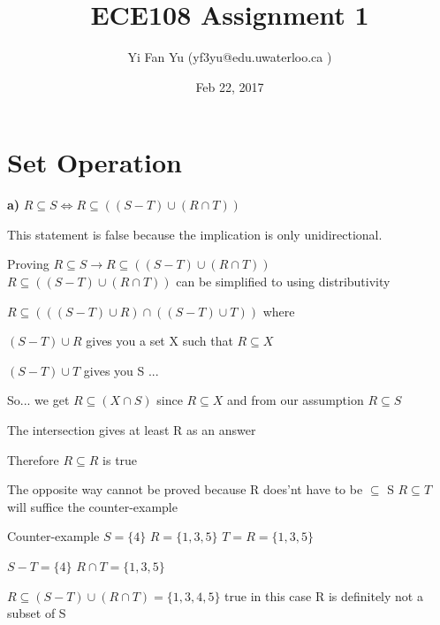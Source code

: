 \documentclass[12pts,A4]{article}
\begin{document}
\title{ECE108 Assignment 1}
\author{Yi Fan Yu (yf3yu@edu.uwaterloo.ca ) }
\date{Feb 22, 2017}
\maketitle


\section{Set Operation}




\begin{flushleft}

    \textbf{a)}
    $R \subseteq  S \iff R \subseteq  ((S - T) \cup (R \cap T))$ 

    This statement is false because the implication is only unidirectional. 
\bigskip


Proving $R \subseteq  S \rightarrow R \subseteq  ((S - T) \cup (R \cap T)) $ \\ 

$R \subseteq  ((S - T) \cup (R \cap T))$ can be simplified to using distributivity
\bigskip

$R \subseteq ( (( S - T )\cup R )\cap( ( S - T )\cup T) ) $ where

$( S - T )\cup R$ gives you a set X such that $R \subseteq X$

$ ( S - T )\cup T$  gives you S ...
\bigskip

	So... we get $ R \subseteq  (X \cap S) $ 
since $R \subseteq X$ and from our assumption $R \subseteq S$

The intersection gives at least R as an answer

Therefore
$R \subseteq  R$ is true 
 
\bigskip
The opposite way cannot be proved because R does'nt have to be  $\subseteq$ S
$R \subseteq  T$ will suffice the counter-example
\bigskip

Counter-example $ S = \{4\}$
$R = \{1,3,5\}$
$T = R = \{1,3,5\}$

$S-T = \{4\}$
$R \cap T = \{1,3,5\}$

$ R \subseteq (S - T) \cup (R \cap T) = \{1,3,4,5\}$ true
in this case R is definitely not a subset of S



\end{flushleft}

\pagebreak
\end{document}

